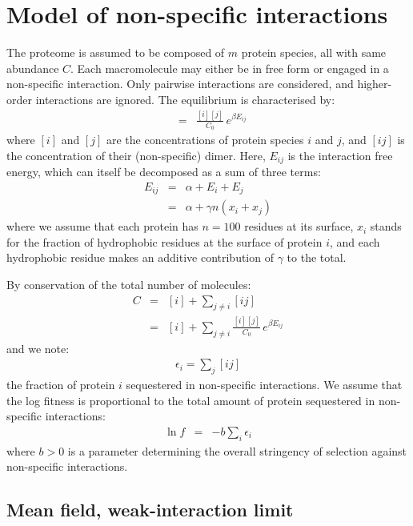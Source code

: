 \documentclass{article}
\begin{document}
\section*{Model of non-specific interactions}

The proteome is assumed to be composed of $m$ protein species, all with same abundance $C$. Each macromolecule may either be in free form or engaged in a non-specific interaction. Only pairwise interactions are considered, and higher-order interactions are ignored.
The equilibrium is characterised by:
\begin{eqnarray}
[ij] &=& \frac{[i][j]}{C_0} \, e^{\beta E_{ij}}
\end{eqnarray}
where $[i]$ and $[j]$ are the concentrations of protein species $i$ and $j$, and $[ij]$ is the concentration of their (non-specific) dimer. Here, $E_{ij}$ is the interaction free energy, which can itself be decomposed as a sum of three terms:
\begin{eqnarray}
E_{ij} &=& \alpha + E_i + E_j 
\\
&=& \alpha + \gamma n (x_i + x_j)
\end{eqnarray}
where we assume that each protein has $n=100$ residues at its surface, $x_i$ stands for the fraction of hydrophobic residues at the surface of protein $i$, and each hydrophobic residue makes an additive contribution of $\gamma$ to the total.


By conservation of the total number of molecules:
\begin{eqnarray}
C &=& [i] + \sum_{j \neq i} [ij] \\
&=& [i] + \sum_{j \neq i} \frac{[i][j]}{C_0} \, e^{\beta E_{ij}}
\end{eqnarray}
and we note:
\begin{eqnarray}
\epsilon_i = \sum_j [ij]
\end{eqnarray}
the fraction of protein $i$ sequestered in non-specific interactions.
We assume that the log fitness is proportional to the total amount of protein sequestered in non-specific interactions:
\begin{eqnarray}
\ln f &=& -b \sum_i \epsilon_i
\end{eqnarray}
where $b>0$ is a parameter determining the overall stringency of selection against non-specific interactions.

\subsection*{Mean field, weak-interaction limit}
\end{document}
